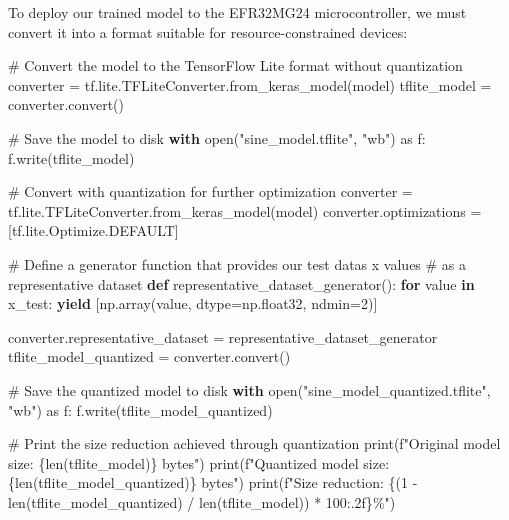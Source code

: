 \documentclass[
  9pt,
  letterpaper,
  abstract,
  titlepage]{scrbook}
\newenvironment{Shaded}{\begin{snugshade}}{\end{snugshade}}
\newcommand{\BuiltInTok}[1]{\textcolor[rgb]{0.00,0.23,0.31}{#1}}
\newcommand{\CommentTok}[1]{\textcolor[rgb]{0.37,0.37,0.37}{#1}}
\newcommand{\ControlFlowTok}[1]{\textcolor[rgb]{0.00,0.23,0.31}{\textbf{#1}}}
\newcommand{\DecValTok}[1]{\textcolor[rgb]{0.68,0.00,0.00}{#1}}
\newcommand{\ImportTok}[1]{\textcolor[rgb]{0.00,0.46,0.62}{#1}}
\newcommand{\KeywordTok}[1]{\textcolor[rgb]{0.00,0.23,0.31}{\textbf{#1}}}
\newcommand{\NormalTok}[1]{\textcolor[rgb]{0.00,0.23,0.31}{#1}}
\newcommand{\OperatorTok}[1]{\textcolor[rgb]{0.37,0.37,0.37}{#1}}
\newcommand{\SpecialCharTok}[1]{\textcolor[rgb]{0.37,0.37,0.37}{#1}}
\newcommand{\SpecialStringTok}[1]{\textcolor[rgb]{0.13,0.47,0.30}{#1}}
\newcommand{\StringTok}[1]{\textcolor[rgb]{0.13,0.47,0.30}{#1}}
\begin{document}
To deploy our trained model to the EFR32MG24 microcontroller, we must
convert it into a format suitable for resource-constrained devices:

\begin{Shaded}
\begin{Highlighting}[]
\CommentTok{\# Convert the model to the TensorFlow Lite format without quantization}
\NormalTok{converter }\OperatorTok{=}\NormalTok{ tf.lite.TFLiteConverter.from\_keras\_model(model)}
\NormalTok{tflite\_model }\OperatorTok{=}\NormalTok{ converter.convert()}

\CommentTok{\# Save the model to disk}
\ControlFlowTok{with} \BuiltInTok{open}\NormalTok{(}\StringTok{"sine\_model.tflite"}\NormalTok{, }\StringTok{"wb"}\NormalTok{) }\ImportTok{as}\NormalTok{ f:}
\NormalTok{    f.write(tflite\_model)}

\CommentTok{\# Convert with quantization for further optimization}
\NormalTok{converter }\OperatorTok{=}\NormalTok{ tf.lite.TFLiteConverter.from\_keras\_model(model)}
\NormalTok{converter.optimizations }\OperatorTok{=}\NormalTok{ [tf.lite.Optimize.DEFAULT]}

\CommentTok{\# Define a generator function that provides our test data\textquotesingle{}s x values}
\CommentTok{\# as a representative dataset}
\KeywordTok{def}\NormalTok{ representative\_dataset\_generator():}
  \ControlFlowTok{for}\NormalTok{ value }\KeywordTok{in}\NormalTok{ x\_test:}
    \ControlFlowTok{yield}\NormalTok{ [np.array(value, dtype}\OperatorTok{=}\NormalTok{np.float32, ndmin}\OperatorTok{=}\DecValTok{2}\NormalTok{)]}
    
\NormalTok{converter.representative\_dataset }\OperatorTok{=}\NormalTok{ representative\_dataset\_generator}
\NormalTok{tflite\_model\_quantized }\OperatorTok{=}\NormalTok{ converter.convert()}

\CommentTok{\# Save the quantized model to disk}
\ControlFlowTok{with} \BuiltInTok{open}\NormalTok{(}\StringTok{"sine\_model\_quantized.tflite"}\NormalTok{, }\StringTok{"wb"}\NormalTok{) }\ImportTok{as}\NormalTok{ f:}
\NormalTok{    f.write(tflite\_model\_quantized)}

\CommentTok{\# Print the size reduction achieved through quantization}
\BuiltInTok{print}\NormalTok{(}\SpecialStringTok{f"Original model size: }\SpecialCharTok{\{}\BuiltInTok{len}\NormalTok{(tflite\_model)}\SpecialCharTok{\}}\SpecialStringTok{ bytes"}\NormalTok{)}
\BuiltInTok{print}\NormalTok{(}\SpecialStringTok{f"Quantized model size: }\SpecialCharTok{\{}\BuiltInTok{len}\NormalTok{(tflite\_model\_quantized)}\SpecialCharTok{\}}\SpecialStringTok{ bytes"}\NormalTok{)}
\BuiltInTok{print}\NormalTok{(}\SpecialStringTok{f"Size reduction: }\SpecialCharTok{\{}\NormalTok{(}\DecValTok{1} \OperatorTok{{-}} \BuiltInTok{len}\NormalTok{(tflite\_model\_quantized) }\OperatorTok{/} \BuiltInTok{len}\NormalTok{(tflite\_model)) }\OperatorTok{*} \DecValTok{100}\SpecialCharTok{:.2f\}}\SpecialStringTok{\%"}\NormalTok{)}
\end{Highlighting}
\end{Shaded}
\end{document}
